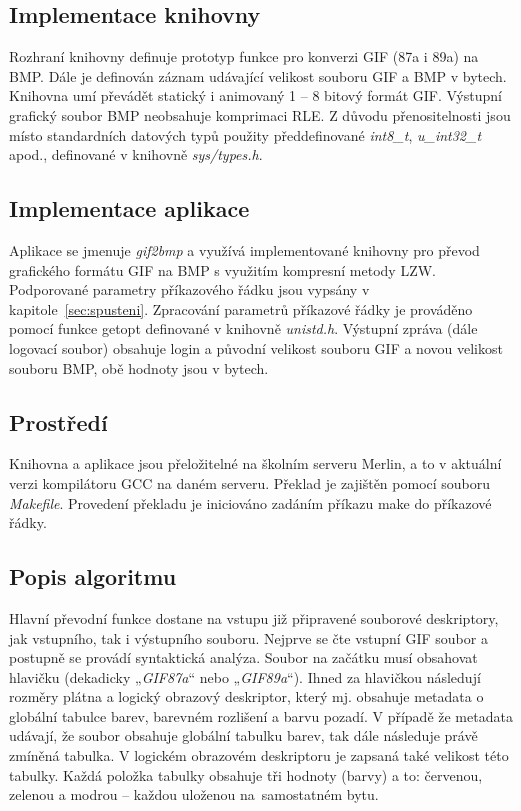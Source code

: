 \documentclass[a4paper,12pt,times]{article}
\begin{document}
\subsection{Implementace knihovny}
Rozhraní knihovny definuje prototyp funkce pro konverzi GIF \cite{GIF} (87a i 89a) na BMP. Dále je definován záznam udávající velikost souboru GIF a BMP v bytech. Knihovna umí převádět statický i animovaný 1 -- 8 bitový formát GIF. Výstupní grafický soubor BMP neobsahuje komprimaci RLE. Z důvodu přenositelnosti jsou místo standardních datových typů použity předdefinované \textit{int8\_t}, \textit{u\_int32\_t} apod., definované v knihovně \textit{sys/types.h}.

\subsection{Implementace aplikace}
Aplikace se jmenuje \textit{gif2bmp} a využívá implementované knihovny pro převod grafického formátu GIF na BMP s využitím kompresní metody LZW. Podporované parametry příkazového řádku jsou vypsány v kapitole~\ref{sec:spusteni}. Zpracování parametrů příkazové řádky je prováděno pomocí funkce getopt definované v knihovně \textit{unistd.h}. Výstupní zpráva (dále logovací soubor) obsahuje login a původní velikost souboru GIF a novou velikost souboru BMP, obě hodnoty jsou v bytech.

\subsection{Prostředí}
Knihovna a aplikace jsou přeložitelné na školním serveru Merlin, a to v aktuální verzi kompilátoru GCC na daném serveru. Překlad je zajištěn pomocí souboru \textit{Makefile}. Provedení překladu je iniciováno zadáním příkazu make do příkazové řádky.

\subsection{Popis algoritmu}
Hlavní převodní funkce dostane na vstupu již připravené souborové deskriptory, jak vstupního, tak i výstupního souboru. Nejprve se čte vstupní GIF soubor a postupně se provádí syntaktická analýza. Soubor na začátku musí obsahovat hlavičku (dekadicky „\textit{GIF87a}“ nebo „\textit{GIF89a}“). Ihned za hlavičkou následují rozměry plátna a logický obrazový deskriptor, který mj. obsahuje metadata o globální tabulce barev, barevném rozlišení a barvu pozadí. V případě že metadata udávají, že soubor obsahuje globální tabulku barev, tak dále následuje právě zmíněná tabulka. V logickém obrazovém deskriptoru je zapsaná také velikost této tabulky. Každá položka tabulky obsahuje tři hodnoty (barvy) a to: červenou, zelenou a modrou – každou uloženou na~samostatném bytu.
\end{document}
